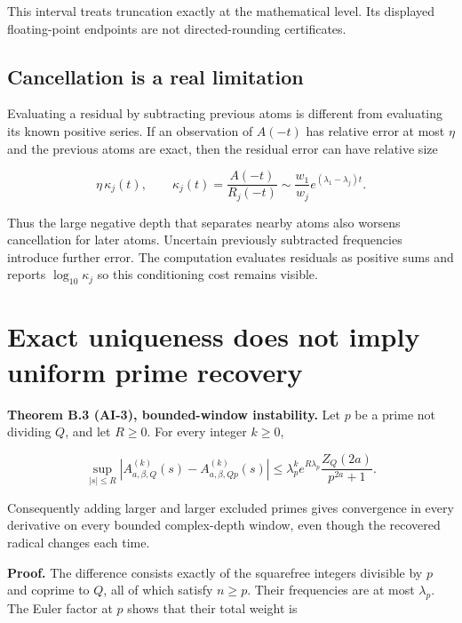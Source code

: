 This interval treats truncation exactly at the mathematical level. Its
displayed floating-point endpoints are not directed-rounding
certificates.

\hypertarget{cancellation-is-a-real-limitation}{%
\subsection{Cancellation is a real
limitation}\label{cancellation-is-a-real-limitation}}

Evaluating a residual by subtracting previous atoms is different from
evaluating its known positive series. If an observation of \(A(-t)\) has
relative error at most \(\eta\) and the previous atoms are exact, then
the residual error can have relative size

\[
 \eta\,\kappa_j(t),\qquad
 \kappa_j(t)=\frac{A(-t)}{R_j(-t)}
 \sim\frac{w_1}{w_j}e^{(\lambda_1-\lambda_j)t}.
\]

Thus the large negative depth that separates nearby atoms also worsens
cancellation for later atoms. Uncertain previously subtracted
frequencies introduce further error. The computation evaluates residuals
as positive sums and reports \(\log_{10}\kappa_j\) so this conditioning
cost remains visible.

\hypertarget{exact-uniqueness-does-not-imply-uniform-prime-recovery}{%
\section{Exact uniqueness does not imply uniform prime
recovery}\label{exact-uniqueness-does-not-imply-uniform-prime-recovery}}

\textbf{Theorem B.3 (AI-3), bounded-window instability.} Let \(p\) be a prime
not dividing \(Q\), and let \(R\ge0\). For every integer \(k\ge0\),

\[
 \boxed{\displaystyle
 \sup_{|s|\le R}|A_{a,\beta,Q}^{(k)}(s)-A_{a,\beta,Qp}^{(k)}(s)|
 \le \lambda_p^k e^{R\lambda_p}
      \frac{Z_Q(2a)}{p^{2a}+1}.}
\]

Consequently adding larger and larger excluded primes gives convergence
in every derivative on every bounded complex-depth window, even though
the recovered radical changes each time.

\textbf{Proof.} The difference consists exactly of the squarefree
integers divisible by \(p\) and coprime to \(Q\), all of which satisfy
\(n\ge p\). Their frequencies are at most \(\lambda_p\). The Euler
factor at \(p\) shows that their total weight is

